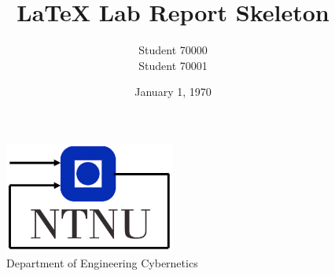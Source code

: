 \documentclass[11pt, a4paper, USenglish]{article} %
\begin{document}
\title{LaTeX Lab Report Skeleton}
\author{Student 70000\\Student 70001}
\date{January 1, 1970}
\begin{titlepage}
    \maketitle
    \begin{figure}
    \centering
    \includegraphics[width=0.5\textwidth]{figures/itk_ntnu}\\
    Department of Engineering Cybernetics
    \end{figure}
    \thispagestyle{empty}
\end{titlepage}

\newpage
\tableofcontents
\thispagestyle{empty} %


\newpage
\setcounter{page}{1}






\newpage
{}


\label{sec:bibliography}
\end{document}
